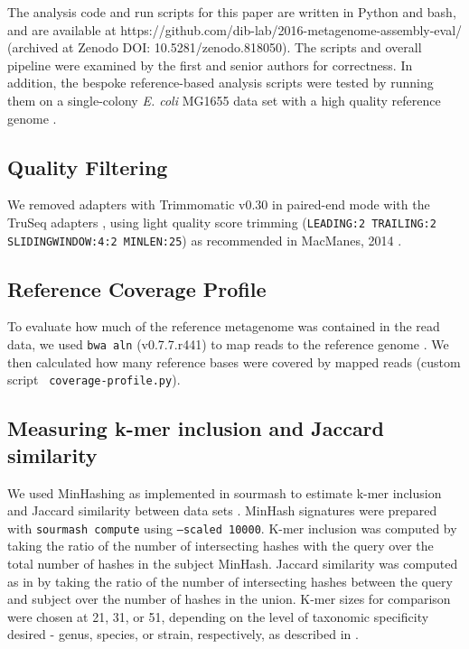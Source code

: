 \documentclass[11pt]{article}
\begin{document}
The analysis code and run scripts for this paper are written in Python
and bash, and are available at
https://github.com/dib-lab/2016-metagenome-assembly-eval/ (archived at
Zenodo DOI: 10.5281/zenodo.818050). The scripts and overall
pipeline were examined by the first and senior authors for
correctness.  In addition, the bespoke reference-based analysis
scripts were tested by running them on a single-colony {\em E. coli}
MG1655 data set with a high quality reference genome
\cite{chitsaz2011}.

\subsection*{Quality Filtering} 

We removed adapters with Trimmomatic v0.30 in paired-end mode with the
TruSeq adapters \cite{trimmomatic}, using light quality score trimming
({\tt LEADING:2 TRAILING:2 SLIDINGWINDOW:4:2 MINLEN:25})
as recommended in MacManes, 2014 \cite{macmanes2014optimal}.

\subsection*{Reference Coverage Profile}

To evaluate how much of the reference metagenome was contained in the
read data, we used {\tt bwa aln} (v0.7.7.r441) to map reads to the
reference genome \cite{bwa}.  We then calculated how many reference
bases were covered by mapped reads (custom script {\tt
  coverage-profile.py}).


\subsection*{Measuring k-mer inclusion and Jaccard similarity}

We used MinHashing as implemented in sourmash to estimate k-mer
inclusion and Jaccard similarity between data sets \cite{sourmash}.
MinHash signatures were prepared with {\tt sourmash compute} using
{\tt --scaled 10000}.  K-mer inclusion was computed by taking the ratio of
the number of intersecting hashes with the query over the total number
of hashes in the subject MinHash. Jaccard similarity was computed as
in \cite{mash} by taking the ratio of the number of intersecting
hashes between the query and subject over the number of hashes in the
union.  K-mer sizes for comparison were chosen at 21, 31, or 51,
depending on the level of taxonomic specificity desired - genus,
species, or strain, respectively, as described in \cite{metapalette}.
\end{document}
